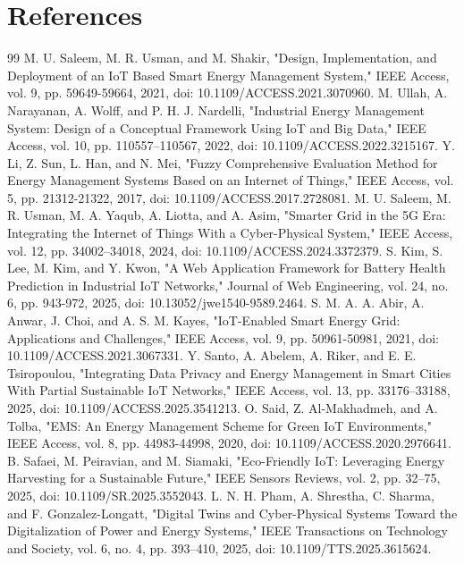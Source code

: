 \documentclass[technologies,article,submit,pdftex,moreauthors]{Definitions/mdpi}
\begin{document}
\section{References}
\begin{thebibliography}{99}
 M. U. Saleem, M. R. Usman, and M. Shakir, "Design, Implementation, and Deployment of an IoT Based Smart Energy Management System," IEEE Access, vol. 9, pp. 59649-59664, 2021, doi: 10.1109/ACCESS.2021.3070960.
 M. Ullah, A. Narayanan, A. Wolff, and P. H. J. Nardelli, "Industrial Energy Management System: Design of a Conceptual Framework Using IoT and Big Data," IEEE Access, vol. 10, pp. 110557--110567, 2022, doi: 10.1109/ACCESS.2022.3215167.
 Y. Li, Z. Sun, L. Han, and N. Mei, "Fuzzy Comprehensive Evaluation Method for Energy Management Systems Based on an Internet of Things," IEEE Access, vol. 5, pp. 21312-21322, 2017, doi: 10.1109/ACCESS.2017.2728081.
 M. U. Saleem, M. R. Usman, M. A. Yaqub, A. Liotta, and A. Asim, "Smarter Grid in the 5G Era: Integrating the Internet of Things With a Cyber-Physical System," IEEE Access, vol. 12, pp. 34002--34018, 2024, doi: 10.1109/ACCESS.2024.3372379.
 S. Kim, S. Lee, M. Kim, and Y. Kwon, "A Web Application Framework for Battery Health Prediction in Industrial IoT Networks," Journal of Web Engineering, vol. 24, no. 6, pp. 943-972, 2025, doi: 10.13052/jwe1540-9589.2464.
 S. M. A. A. Abir, A. Anwar, J. Choi, and A. S. M. Kayes, "IoT-Enabled Smart Energy Grid: Applications and Challenges," IEEE Access, vol. 9, pp. 50961-50981, 2021, doi: 10.1109/ACCESS.2021.3067331.
 Y. Santo, A. Abelem, A. Riker, and E. E. Tsiropoulou, "Integrating Data Privacy and Energy Management in Smart Cities With Partial Sustainable IoT Networks," IEEE Access, vol. 13, pp. 33176--33188, 2025, doi: 10.1109/ACCESS.2025.3541213.
 O. Said, Z. Al-Makhadmeh, and A. Tolba, "EMS: An Energy Management Scheme for Green IoT Environments," IEEE Access, vol. 8, pp. 44983-44998, 2020, doi: 10.1109/ACCESS.2020.2976641.
 B. Safaei, M. Peiravian, and M. Siamaki, "Eco-Friendly IoT: Leveraging Energy Harvesting for a Sustainable Future," IEEE Sensors Reviews, vol. 2, pp. 32--75, 2025, doi: 10.1109/SR.2025.3552043.
 L. N. H. Pham, A. Shrestha, C. Sharma, and F. Gonzalez-Longatt, "Digital Twins and Cyber-Physical Systems Toward the Digitalization of Power and Energy Systems," IEEE Transactions on Technology and Society, vol. 6, no. 4, pp. 393--410, 2025, doi: 10.1109/TTS.2025.3615624.

\end{thebibliography}
\end{document}
